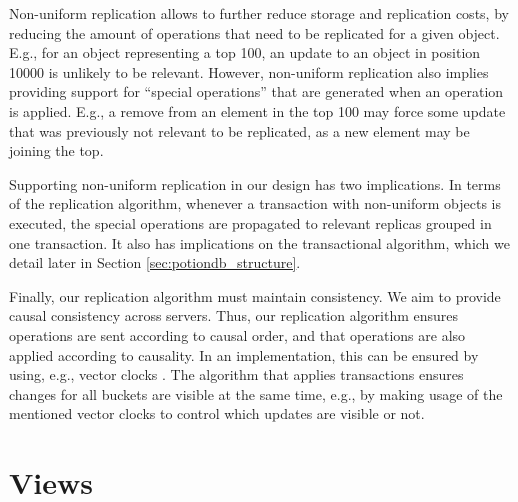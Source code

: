 
Non-uniform replication allows to further reduce storage and replication costs, by reducing the amount of operations that need to be replicated for a given object.
E.g., for an object representing a top 100, an update to an object in position 10000 is unlikely to be relevant.
However, non-uniform replication also implies providing support for ``special operations'' that are generated when an operation is applied.
E.g., a remove from an element in the top 100 may force some update that was previously not relevant to be replicated, as a new element may be joining the top. 

Supporting non-uniform replication in our design has two implications.
In terms of the replication algorithm, whenever a transaction with non-uniform objects is executed, the special operations are propagated to relevant replicas grouped in one transaction.
It also has implications on the transactional algorithm, which we detail later in Section \ref{sec:potiondb_structure}.

Finally, our replication algorithm must maintain consistency.
We aim to provide causal consistency across servers.
Thus, our replication algorithm ensures operations are sent according to causal order, and that operations are also applied according to causality.
In an implementation, this can be ensured by using, e.g., vector clocks \cite{???}.
The algorithm that applies transactions ensures changes for all buckets are visible at the same time, e.g., by making usage of the mentioned vector clocks to control which updates are visible or not.




\section{Views}
\label{sec:views_research_statement}

